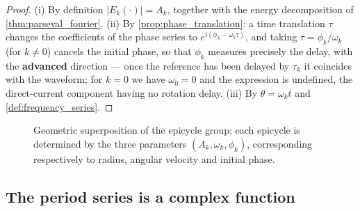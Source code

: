 \begin{proof}
(i) By definition $|E_k(\cdot)|=A_k$, together with the energy decomposition of \cref{thm:parseval_fourier}. (ii) By \cref{prop:phase_translation}: a time translation $\tau$ changes the coefficients of the phase series to $e^{i(\phi_k-\omega_k\tau)}$, and taking $\tau=\phi_k/\omega_k$ (for $k\ne0$) cancels the initial phase, so that $\phi_k$ measures precisely the delay, with the \textbf{advanced} direction --- once the reference has been delayed by $\tau_k$ it coincides with the waveform; for $k=0$ we have $\omega_0=0$ and the expression is undefined, the direct-current component having no rotation delay. (iii) By $\theta=\omega_kt$ and \cref{def:frequency_series}.
\end{proof}

\begin{figure}[htbp]
\centering
{}
\caption{Geometric superposition of the epicycle group: each epicycle is determined by the three parameters $(A_k,\omega_k,\phi_k)$, corresponding respectively to radius, angular velocity and initial phase.}
\label{fig:ps_epicycle_geometry}
\end{figure}

\subsection{The period series is a complex function}

